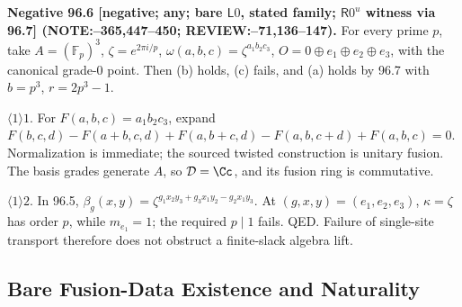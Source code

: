 \textbf{Negative 96.6 [negative; any; bare \(\mathsf L0\), stated family; \(\mathsf R0^u\) witness via 96.7] (NOTE:--365,447--450; REVIEW:--71,136--147).}
For every prime \(p\), take \(A=(\mathbb F_p)^3\), \(\zeta=e^{2\pi i/p}\),
\(\omega(a,b,c)=\zeta^{a_1b_2c_3}\), \(O=0\oplus e_1\oplus e_2\oplus e_3\), with the canonical grade-0 point.
Then (b) holds, (c) fails, and (a) holds by 96.7 with \(b=p^3\), \(r=2p^3-1\).
\par\(\langle1\rangle1\). For \(F(a,b,c)=a_1b_2c_3\), expand
\(F(b,c,d)-F(a+b,c,d)+F(a,b+c,d)-F(a,b,c+d)+F(a,b,c)=0\).
Normalization is immediate; the sourced twisted construction is unitary fusion. The basis grades generate \(A\),
so \(\mathcal D=\Cc\), and its fusion ring is commutative.
\par\(\langle1\rangle2\). In 96.5, \(\beta_g(x,y)=\zeta^{g_1x_2y_3+g_3x_1y_2-g_2x_1y_3}\).
At \((g,x,y)=(e_1,e_2,e_3)\), \(\kappa=\zeta\) has order \(p\), while \(m_{e_1}=1\); the required \(p\mid1\) fails.
QED. Failure of single-site transport therefore does not obstruct a finite-slack algebra lift.

\subsection{Bare Fusion-Data Existence and Naturality}

